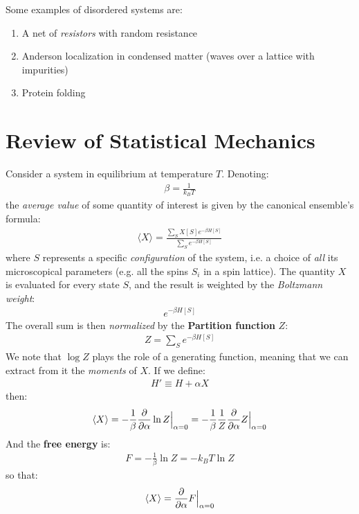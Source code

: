 \documentclass[../template.tex]{subfiles}
\begin{document}
Some examples of disordered systems are:
\begin{enumerate}
    \item A net of \textit{resistors} with random resistance
    \item Anderson localization in condensed matter (waves over a lattice with impurities)
    \item Protein folding 
\end{enumerate}

\section{Review of Statistical Mechanics}
Consider a system in equilibrium at temperature $T$. Denoting:
\begin{align*}
    \beta = \frac{1}{k_B T} 
\end{align*} 
the \textit{average value} of some quantity of interest is given by the canonical ensemble's formula:
\begin{align*}
    \langle X \rangle = \frac{\displaystyle \sum_S X[S] e^{-\beta H[S]}}{\displaystyle \sum_S e^{-\beta H[S]}} 
\end{align*} 
where $S$ represents a specific \textit{configuration} of the system, i.e. a choice of \textit{all} its microscopical parameters (e.g. all the spins $S_i$ in a spin lattice). The quantity $X$ is evaluated for every state $S$, and the result is weighted by the \textit{Boltzmann weight}:
\begin{align*}
    e^{-\beta H[S]}
\end{align*}   
The overall sum is then \textit{normalized} by the \textbf{Partition function} $Z$:
\begin{align*}
    Z = \sum_S e^{- \beta H[S]}
\end{align*}   
We note that $\log Z$ plays the role of a generating function, meaning that we can extract from it the \textit{moments} of $X$. If we define:
\begin{align*}
    H' \equiv H + \alpha X
\end{align*}    
then:
\begin{align*}
    \langle X \rangle = -\frac{1}{\beta} \pdv{\alpha} \ln Z \Big|_{\alpha = 0} = - \frac{1}{\beta} \frac{1}{Z} \pdv{\alpha} Z\Big|_{\alpha = 0}   
\end{align*}
And the \textbf{free energy} is:
\begin{align*}
    F = -\frac{1}{\beta} \ln Z = -k_B T \ln Z 
\end{align*} 
so that:
\begin{align*}
    \langle X \rangle = \pdv{\alpha} F \Big|_{\alpha = 0}
\end{align*}
\end{document}
